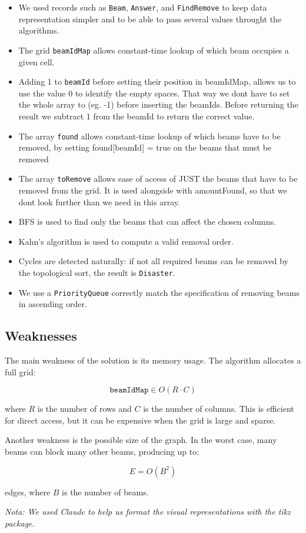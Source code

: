 \documentclass[runningheads]{llncs}
\begin{document}
  \begin{itemize}
      \item We used records such as \texttt{Beam}, \texttt{Answer}, and \texttt{FindRemove} to keep data representation
  simpler and to be able to pass several values throught the algorithms.
      \item The grid \texttt{beamIdMap} allows constant-time lookup of which beam occupies a given cell.
      \item Adding 1 to \texttt{beamId} before setting their position in beamIdMap, allows us to use the value 0 to identify the empty spaces. That way we dont have to set the whole array to (eg. -1) before inserting the beamIds. Before returning the result we subtract 1 from the beamId to return the correct value.
      \item The array \texttt{found} allows constant-time lookup of which beams have to be removed, by setting found[beamId] = true on the beams that must be removed
      \item The array \texttt{toRemove} allows ease of access of JUST the beams that have to be removed from the grid. It is used alongside with amountFound, so that we dont look further than we need in this array. 
      \item BFS is used to find only the beams that can affect the chosen columns.
      \item Kahn's algorithm is used to compute a valid removal order.
      \item Cycles are detected naturally: if not all required beams can be removed by the topological sort, the result is
  \texttt{Disaster}.
      \item We use a \texttt{PriorityQueue} correctly match the specification of removing beams in ascending order.
  \end{itemize}

  \subsection{Weaknesses}

  The main weakness of the solution is its memory usage. The algorithm allocates a full grid:

  \[
  \texttt{beamIdMap} \in O(R \cdot C)
  \]

  where $R$ is the number of rows and $C$ is the number of columns. This is efficient for direct access, but it can be
  expensive when the grid is large and sparse.

  Another weakness is the possible size of the graph. In the worst case, many beams can block many other beams, producing
  up to:

  \[
  E = O(B^2)
  \]

  edges, where $B$ is the number of beams.

\vfill
{\small\itshape Nota: We used Claude to help us format the visual representations with the tikz package.}
\end{document}
